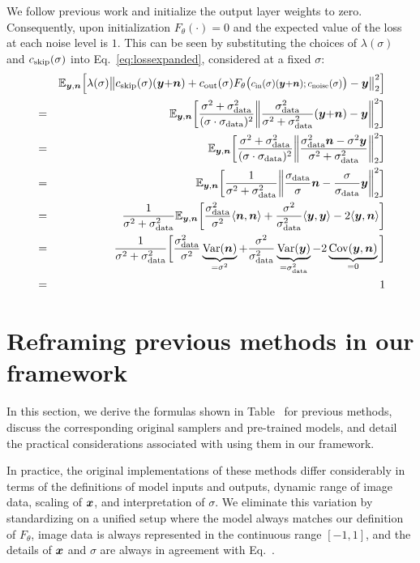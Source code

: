 We follow previous work and initialize the output layer weights to zero. Consequently, upon initialization $F_\theta(\cdot) = 0$ and the expected value of the loss at each noise level is $1$. This can be seen by substituting the choices of $\lambda(\sigma)$ and $c_\text{skip}(\sigma)$ into Eq.~\ref{eq:lossexpanded}, considered at a fixed $\sigma$:
\begin{eqnarray}
  && \mathbb{E}_{\signal, \noise} \Big[ \lambda(\sigma) \big\lVert \cskip(\sigma) (\signal {+} \noise) + \cout(\sigma) F_\theta\big(\Fargs\big) - \signal \big\rVert^2_2 \Big] \\
  &=& \mathbb{E}_{\signal, \noise} \bigg[ \frac{\sigma^2 + \sdata^2}{(\sigma \cdot \sdata)^2} \bigg\lVert \frac{\sdata^2}{\sigma^2 + \sdata^2} (\signal {+} \noise) - \signal \bigg\rVert^2_2 \bigg] \\
  &=& \mathbb{E}_{\signal, \noise} \bigg[ \frac{\sigma^2 + \sdata^2}{(\sigma \cdot \sdata)^2} \bigg\lVert \frac{\sdata^2 \noise - \sigma^2 \signal}{\sigma^2 + \sdata^2} \bigg\rVert^2_2 \bigg] \\
  &=& \mathbb{E}_{\signal, \noise} \bigg[ \frac{1}{\sigma^2 + \sdata^2} \bigg\lVert \frac{\sdata}{\sigma} \noise - \frac{\sigma}{\sdata} \signal \bigg\rVert^2_2 \bigg] \\
  &=& \frac{1}{\sigma^2 + \sdata^2} \mathbb{E}_{\signal, \noise} \bigg[   \frac{\sdata^2}{\sigma^2} \langle \noise, \noise \rangle + \frac{\sigma^2}{\sdata^2} \langle \signal, \signal \rangle - 2 \langle \signal, \noise \rangle \bigg] \\
  &=& \frac{1}{\sigma^2 + \sdata^2} \bigg[ \frac{\sdata^2}{\sigma^2} \underbrace{\Var(\noise)}_{= \sigma^2} + \frac{\sigma^2}{\sdata^2} \underbrace{\Var(\signal)}_{= \sdata^2} - 2 \underbrace{\Cov(\signal, \noise)}_{=0} \bigg] \\
  &=& 1
\end{eqnarray}

\section{Reframing previous methods in our framework}
\label{app:reframing}

In this section, we derive the formulas shown in Table~ for previous methods, discuss the corresponding original samplers and pre-trained models, and detail the practical considerations associated with using them in our framework.

In practice, the original implementations of these methods differ considerably in terms of the definitions of model inputs and outputs, dynamic range of image data, scaling of $\boldsymbol{x}$, and interpretation of $\sigma$.
We eliminate this variation by standardizing on a unified setup where the model always matches our definition of $F_\theta$, image data is always represented in the continuous range $[-1, 1]$, and the details of $\boldsymbol{x}$ and $\sigma$ are always in agreement with Eq.~.

